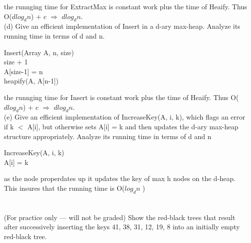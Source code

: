 \documentclass[12pt]{article}
\begin{document}
the runnging time for ExtractMax is constant work plus the time of Heaify. Thus O($dlog_dn$) + c $\Rightarrow$ $dlog_dn$.\\

(d) Give an efficient implementation of Insert in a d-ary max-heap. Analyze its running
time in terms of d and n.

\begin{algorithm}[H]
	Insert(Array A, n,  size)\\
		size + 1\\
		A[size-1] = n\\
		heapify(A, A[n-1])
	
\label{GETMAX} 
\end{algorithm}
the runnging time for Insert is constant work plus the time of Heaify. Thus O($dlog_dn$) + c $\Rightarrow$ $dlog_dn$.\\


(e) Give an efficient implementation of IncreaseKey(A, i, k), which flags an error if k $<$ A[i], but otherwise sets A[i] = k and then updates the d-ary max-heap structure
appropriately. Analyze its running time in terms of d and n\\
 	\begin{algorithm}[H]
		IncreaseKey(A, i, k)\\
			A[i] = k\\
	\end{algorithm}
	as the node properdates up it updates the key of max h nodes on the d-heap. This insures that the running time is O($log_dn$
)  	
 	
 	\section{}
 (For practice only — will not be graded) Show the red-black trees that result after successively inserting the keys 41, 38, 31, 12, 19, 8 into an initially empty red-black tree.
\end{document}

